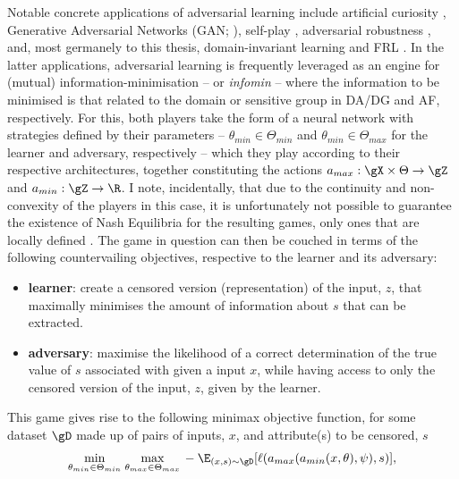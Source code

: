 Notable concrete applications of adversarial learning include artificial curiosity
\citep{schmidhuber1992learning}, Generative Adversarial Networks (\ac{GAN};
\cite{goodfellow14generative}), self-play \citep{silver2018general}, adversarial robustness
\citep{szegedy2013intriguing}, and, most germanely to this thesis, domain-invariant learning
\citep{ganin2016domain, zhao2019learning} and \ac{FRL} \citep{edwards2015censoring,
madras2018learning}.
%
%
In the latter applications, adversarial learning is frequently leveraged as an engine for
(mutual) information-minimisation -- or \emph{infomin} -- where the information to be minimised is that
related to the domain or sensitive group in \ac{DA}/\ac{DG} and \ac{AF}, respectively.
%
For this, both players take the form of a neural network with strategies defined by their
parameters -- \(\theta_{min} \in \Theta_{min}\) and \(\theta_{min} \in \Theta_{max}\) for the
learner and adversary, respectively -- which they play according to their respective architectures,
together constituting the actions \(a_{max}: \gX \times \Theta \to \gZ \) and \(a_{min}: \gZ \time
\Psi \to \R \).
%
I note, incidentally, that due to the continuity and non-convexity of the players in this case, it
is unfortunately not possible to guarantee the existence of Nash Equilibria for the resulting
games, only ones that are locally defined \citep{unterthiner2018coulomb}.
%
The game in question can then be couched in terms of the following countervailing objectives,
respective to the learner and its adversary:
%
\begin{itemize}
  \item 
    \textbf{learner}: create a censored version (representation) of the input, \(z\), that
    maximally minimises the amount of information about \(s\) that can be extracted.
  \item 
    \textbf{adversary}: maximise the likelihood of a correct determination of the true value of
    \(s\) associated with given a input \(x\), while having access to only the censored version of
    the input, \(z\), given by the learner.
\end{itemize}
%
This game gives rise to the following minimax objective function, for some dataset \(\gD\)
made up of pairs of inputs, \(x\), and attribute(s) to be censored, \(s\)
%
\begin{align}
  \underset{\theta_{min} \in \Theta_{min}}{\text{min}}\; \underset{\theta_{max} \in
  \Theta_{max}}{\text{max}}\,
%
-\E_{(x, s) \sim \gD} [ \ell(a_{max}( a_{min}(x, \theta), \psi ), s ) ],
%
\label{eq:adv-infomin}
\end{align}
